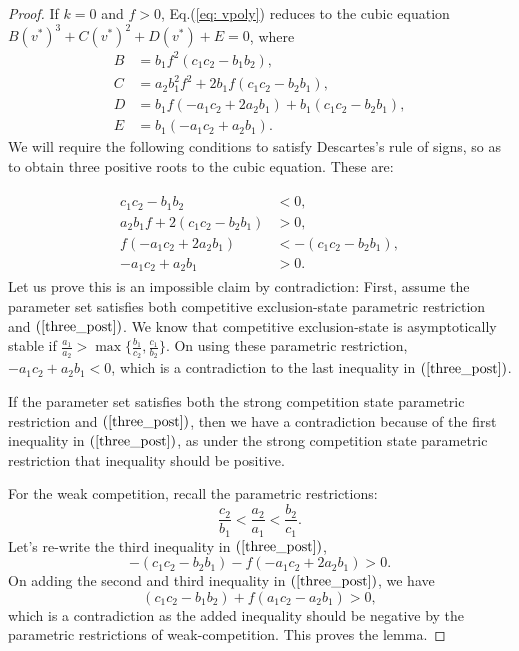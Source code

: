 \documentclass[10pt]{amsart}
\theoremstyle{definition}
\begin{document}
\begin{proof}


If $k=0$ and $f>0$, Eq.(\ref{eq: vpoly}) reduces to the cubic equation $B(v^*)^3+C(v^*)^2+D(v^*)+E=0$, where 
\begin{equation}\label{three_post1}
	\begin{split}
		B&=b_1f^2(c_1c_2-b_1b_2),\\
		C&=a_2b_1^2f^2+2b_1f(c_1c_2-b_2b_1),\\
		D&=b_1f(-a_1c_2+2a_2b_1)+b_1(c_1c_2-b_2b_1),\\
		E&=b_1(-a_1c_2+a_2b_1).
	\end{split}
\end{equation}
We will require the following conditions to satisfy Descartes's rule of signs, so as to obtain three positive roots to the cubic equation. These are:

\begin{align}\label{three_post}
	\begin{split}
		c_1c_2-b_1b_2 &<0, \\
		a_2b_1f+2(c_1c_2-b_2b_1)& >0,\\
		f(-a_1c_2+2a_2b_1) & <-(c_1c_2-b_2b_1),\\
		-a_1c_2+a_2b_1 &>0.
	\end{split}
\end{align}
Let us prove this is an impossible claim by contradiction:
	First, assume the parameter set satisfies both competitive exclusion-state parametric restriction and $(\ref{three_post})$. We know that competitive exclusion-state is asymptotically stable if $\frac{a_1}{a_2} > \max \Big\{ \frac{b_1}{c_2},\frac{c_1}{b_2}  \Big \}$. On using these parametric restriction, $-a_1c_2 + a_2b_1<0$, which is a contradiction to the last inequality in $(\ref{three_post})$.
	
	If the parameter set satisfies both the strong competition state parametric restriction and $(\ref{three_post})$, then we have a contradiction because of the first inequality in $(\ref{three_post})$, as under the strong competition state parametric restriction that inequality should be positive.
	
	For the weak competition, recall the parametric restrictions:
	\[\frac{c_2}{b_1}<\frac{a_2}{a_1}<\frac{b_2}{c_1}.\]
	Let's re-write the third inequality in $(\ref{three_post})$,
	\[ -(c_1c_2-b_2b_1)-f(-a_1c_2+2a_2b_1)>0.\]
	On adding the second and third inequality in $(\ref{three_post})$, we have
	\[(c_1c_2-b_1b_2) + f(a_1c_2-a_2b_1)>0, \]
	which is a contradiction as the added inequality should be negative by the parametric restrictions of weak-competition. This proves the lemma.
	
\end{proof}
\end{document}
